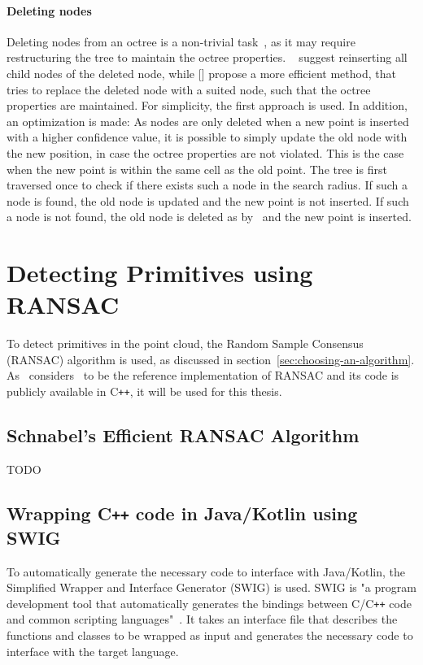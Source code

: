 \paragraph{Deleting nodes}
Deleting nodes from an octree is a non-trivial task~\parencite{samet_design_1989, finkel_quad_1974}, as it may require restructuring the tree to maintain the octree properties.
\citeauthor{finkel_quad_1974}~\parencite{finkel_quad_1974} suggest reinserting all child nodes of the deleted node,
while [] propose a more efficient method, that tries to replace the deleted node with a suited node, such that the octree properties are maintained.
For simplicity, the first approach is used.
In addition, an optimization is made:
As nodes are only deleted when a new point is inserted with a higher confidence value,
it is possible to simply update the old node with the new position, in case the octree properties are not violated.
This is the case when the new point is within the same cell as the old point.
The tree is first traversed once to check if there exists such a node in the search radius.
If such a node is found, the old node is updated and the new point is not inserted.
If such a node is not found, the old node is deleted as by~\cite{finkel_quad_1974} and the new point is inserted.


\section{Detecting Primitives using RANSAC}\label{sec:detecting-primitives-using-ransac}

To detect primitives in the point cloud, the Random Sample Consensus (RANSAC) algorithm is used,
as discussed in section~\ref{sec:choosing-an-algorithm}.
As~\cite{kaiser_survey_2019} considers~\parencite{schnabel_efficient_2007} to be the reference implementation of RANSAC
and its code is publicly available in C\texttt{++}, it will be used for this thesis.

\subsection{Schnabel's Efficient RANSAC Algorithm}
TODO

\subsection{Wrapping C\texttt{++} code in Java/Kotlin using SWIG}
To automatically generate the necessary code to interface with Java/Kotlin,
the Simplified Wrapper and Interface Generator (SWIG) is used.
SWIG is "a program development tool that automatically generates the bindings between C/C\texttt{++}
code and common scripting languages"~\parencite{beazley_swig_1996}.
It takes an interface file that describes the functions and classes to be wrapped as input and generates the
necessary code to interface with the target language.

